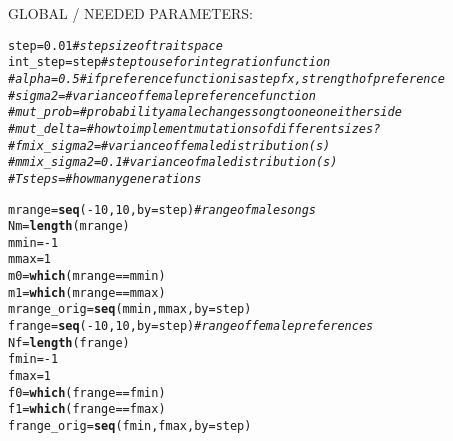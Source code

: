 \documentclass{article}\usepackage[]{graphicx}\usepackage[]{color}
\makeatletter
\newcommand{\hlnum}[1]{\textcolor[rgb]{0.686,0.059,0.569}{#1}}%
\newcommand{\hlcom}[1]{\textcolor[rgb]{0.678,0.584,0.686}{\textit{#1}}}%
\newcommand{\hlopt}[1]{\textcolor[rgb]{0,0,0}{#1}}%
\newcommand{\hlstd}[1]{\textcolor[rgb]{0.345,0.345,0.345}{#1}}%
\newcommand{\hlkwb}[1]{\textcolor[rgb]{0.69,0.353,0.396}{#1}}%
\newcommand{\hlkwc}[1]{\textcolor[rgb]{0.333,0.667,0.333}{#1}}%
\newcommand{\hlkwd}[1]{\textcolor[rgb]{0.737,0.353,0.396}{\textbf{#1}}}%
\newenvironment{kframe}{%
 \def\at@end@of@kframe{}%
 \ifinner\ifhmode%
  \def\at@end@of@kframe{\end{minipage}}%
  \begin{minipage}{\columnwidth}%
 \fi\fi%
 \def\FrameCommand##1{\hskip\@totalleftmargin \hskip-\fboxsep
 \colorbox{shadecolor}{##1}\hskip-\fboxsep
     \hskip-\linewidth \hskip-\@totalleftmargin \hskip\columnwidth}%
 \MakeFramed {\advance\hsize-\width
   \@totalleftmargin\z@ \linewidth\hsize
   \@setminipage}}%
 {\par\unskip\endMakeFramed%
 \at@end@of@kframe}
\newenvironment{knitrout}{}{} %
\makeatother
\begin{document}
\vspace{.1 in}
{\color{red} GLOBAL / NEEDED PARAMETERS:}

\begin{knitrout}
\color{fgcolor}\begin{kframe}
\begin{alltt}
\hlstd{step} \hlkwb{=} \hlnum{0.01} \hlcom{#step size of trait space}
\hlstd{int_step} \hlkwb{=} \hlstd{step} \hlcom{#step to use for integration function}
\hlcom{# alpha = 0.5 #if preference function is a step fx, strength of preference}
\hlcom{# sigma2 = #variance of female preference function}
\hlcom{# mut_prob =  #probability a male changes song to one on either side}
\hlcom{# mut_delta = #how to implement mutations of different sizes?}
\hlcom{# fmix_sigma2 = #variance of female distribution(s)}
\hlcom{# mmix_sigma2 = 0.1 #variance of male distribution(s)}
\hlcom{# Tsteps = #how many generations}

\hlstd{mrange} \hlkwb{=} \hlkwd{seq}\hlstd{(}\hlopt{-}\hlnum{10}\hlstd{,}\hlnum{10}\hlstd{,}\hlkwc{by}\hlstd{=step)} \hlcom{#range of male songs}
\hlstd{Nm} \hlkwb{=} \hlkwd{length}\hlstd{(mrange)}
\hlstd{mmin} \hlkwb{=} \hlopt{-}\hlnum{1}
\hlstd{mmax} \hlkwb{=} \hlnum{1}
\hlstd{m0} \hlkwb{=} \hlkwd{which}\hlstd{(mrange}\hlopt{==}\hlstd{mmin)}
\hlstd{m1} \hlkwb{=} \hlkwd{which}\hlstd{(mrange}\hlopt{==}\hlstd{mmax)}
\hlstd{mrange_orig} \hlkwb{=} \hlkwd{seq}\hlstd{(mmin,mmax,}\hlkwc{by}\hlstd{=step)}
\hlstd{frange} \hlkwb{=} \hlkwd{seq}\hlstd{(}\hlopt{-}\hlnum{10}\hlstd{,}\hlnum{10}\hlstd{,}\hlkwc{by}\hlstd{=step)} \hlcom{#range of female preferences}
\hlstd{Nf} \hlkwb{=} \hlkwd{length}\hlstd{(frange)}
\hlstd{fmin} \hlkwb{=} \hlopt{-}\hlnum{1}
\hlstd{fmax} \hlkwb{=} \hlnum{1}
\hlstd{f0} \hlkwb{=} \hlkwd{which}\hlstd{(frange}\hlopt{==}\hlstd{fmin)}
\hlstd{f1} \hlkwb{=} \hlkwd{which}\hlstd{(frange}\hlopt{==}\hlstd{fmax)}
\hlstd{frange_orig} \hlkwb{=} \hlkwd{seq}\hlstd{(fmin,fmax,}\hlkwc{by}\hlstd{=step)}
\end{alltt}
\end{kframe}
\end{knitrout}
\end{document}
